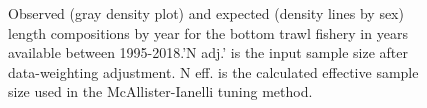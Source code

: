 \documentclass[
]{scrartcl}
\begin{document}
\begin{figure}[H]


\caption{\label{fig-len-fit-bt-1}Observed (gray density plot) and
expected (density lines by sex) length compositions by year for the
bottom trawl fishery in years available between 1995-2018.'N adj.' is
the input sample size after data-weighting adjustment. N eff. is the
calculated effective sample size used in the McAllister-Ianelli tuning
method.}

\end{figure}%
\end{document}
